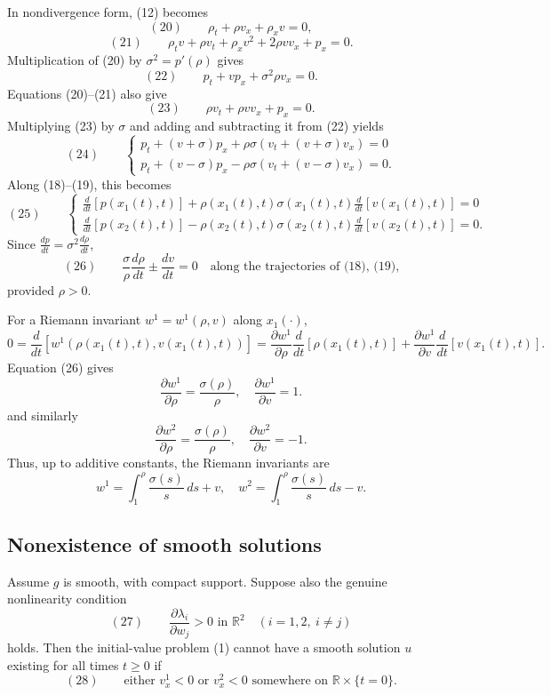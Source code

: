 \begin{example}
In nondivergence form, (12) becomes
$$(20) \qquad \rho_t + \rho v_x + \rho_x v = 0,$$
$$(21) \qquad \rho_t v + \rho v_t + \rho_x v^2 + 2\rho v v_x + p_x = 0.$$
Multiplication of (20) by $\sigma^2=p'(\rho)$ gives
$$(22) \qquad p_t + vp_x + \sigma^2\rho v_x = 0.$$
Equations (20)--(21) also give
$$(23) \qquad \rho v_t + \rho v v_x + p_x = 0.$$
Multiplying (23) by $\sigma$ and adding and subtracting it from (22) yields
$$(24) \qquad \begin{cases} p_t + (v+\sigma)p_x + \rho\sigma(v_t+(v+\sigma)v_x) = 0 \\ p_t + (v-\sigma)p_x - \rho\sigma(v_t+(v-\sigma)v_x) = 0. \end{cases}$$
Along (18)--(19), this becomes
$$(25) \qquad \begin{cases} \frac{d}{dt}[p(x_1(t),t)] + \rho(x_1(t),t)\sigma(x_1(t),t)\frac{d}{dt}[v(x_1(t),t)] = 0 \\ \frac{d}{dt}[p(x_2(t),t)] - \rho(x_2(t),t)\sigma(x_2(t),t)\frac{d}{dt}[v(x_2(t),t)] = 0. \end{cases}$$
Since $\frac{dp}{dt}=\sigma^2\frac{d\rho}{dt}$,
$$(26) \qquad \frac{\sigma}{\rho}\frac{d\rho}{dt} \mathbin{\pm} \frac{dv}{dt} = 0 \quad \text{along the trajectories of (18), (19),}$$
provided $\rho>0$.

For a Riemann invariant $w^1=w^1(\rho,v)$ along $x_1(\cdot)$,
$$0 = \frac{d}{dt}[w^1(\rho(x_1(t),t),v(x_1(t),t))] = \frac{\partial w^1}{\partial\rho}\frac{d}{dt}[\rho(x_1(t),t)] + \frac{\partial w^1}{\partial v}\frac{d}{dt}[v(x_1(t),t)].$$
Equation (26) gives
$$\frac{\partial w^1}{\partial\rho} = \frac{\sigma(\rho)}{\rho}, \quad \frac{\partial w^1}{\partial v} = 1.$$
and similarly
$$\frac{\partial w^2}{\partial\rho} = \frac{\sigma(\rho)}{\rho}, \quad \frac{\partial w^2}{\partial v} = -1.$$
Thus, up to additive constants, the Riemann invariants are
$$w^1 = \int_1^\rho \frac{\sigma(s)}{s}\,ds + v, \quad w^2 = \int_1^\rho \frac{\sigma(s)}{s}\,ds - v.$$
\end{example}

\subsection{Nonexistence of smooth solutions}\label{sec:nonexistence-smooth-solutions-systems}

\begin{theorem}
\label{thm:riemann-invariants-blowup}

Assume $g$ is smooth, with compact support. Suppose also the genuine nonlinearity condition
$$(27) \qquad \frac{\partial\lambda_i}{\partial w_j} > 0 \text{ in } \mathbb{R}^2 \quad (i=1,2,\ i\neq j)$$
holds. Then the initial-value problem (1) cannot have a smooth solution $u$ existing for all times $t\geq 0$ if
$$(28) \qquad \text{either } v^1_x < 0 \text{ or } v^2_x < 0 \text{ somewhere on } \mathbb{R}\times\{t=0\}.$$
\end{theorem}


